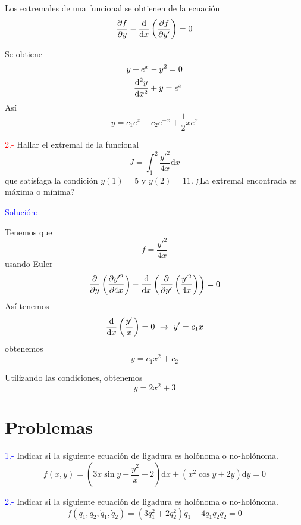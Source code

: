 \documentclass[../main]{subfiles}
\begin{document}
Los extremales de una funcional se obtienen de la ecuación
\begin{equation*}
    \pdv{f}{y}-\dv{}{x}\left(\pdv{f}{y'}\right)=0
\end{equation*}

Se obtiene
\begin{align*}
    y+e^x-y^2=0\\
    \dv{^2 y}{x^2}+y=e^x
\end{align*}
Así
\begin{equation*}
    y=c_1 e^x+c_2e^{-x}+\dfrac{1}{2}xe^x
\end{equation*}

\textcolor{red}{2.-} Hallar el extremal de la funcional
\begin{equation*}
    J=\int_1^2 \dfrac{y'^2}{4x}\mathrm{d}x
\end{equation*}
que satisfaga la condición $y(1)=5$ y $y(2)=11$. ¿La extremal encontrada es máxima o mínima?

\textcolor{blue}{Solución:}

Tenemos que 
\begin{equation*}
    f=\dfrac{y'^2}{4x}
\end{equation*}
usando Euler
\begin{equation*}
    \pdv{}{y}\left(\pdv{y'^2}{4x}\right)-\dv{}{x}\left(\pdv{}{y'}\left(\dfrac{y'^2}{4x}\right)\right)=0
\end{equation*}
Así tenemos
\begin{equation*}
    \dv{}{x}\left(\dfrac{y'}{x}\right)=0 \ \rightarrow \ y'=c_1 x
\end{equation*}
obtenemos
\begin{equation*}
    y=c_1x^2+c_2
\end{equation*}

Utilizando las condiciones, obtenemos
\begin{equation*}
    y=2x^2+3
\end{equation*}

\section*{Problemas}

\textcolor{blue}{1.-} Indicar si la siguiente ecuación de ligadura es holónoma o no-holónoma.
$$f(x,y)=\left(3x \sin y+\dfrac{y^2}{x}+2\right)\mathrm{d}x+(x^2\cos y+2y)\mathrm{d}y=0$$

\textcolor{blue}{2.-} Indicar si la siguiente ecuación de ligadura es holónoma o no-holónoma.
$$f(q_1, q_2, \dot{q}_1, \dot{q}_2)=(3q^2_1+2q^2_2)\dot{q}_1+4q_1q_2\dot{q}_2=0$$
\end{document}

